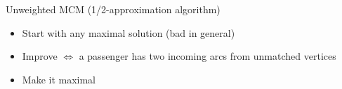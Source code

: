 \begin{frame}{Unweighted MCM (1/2-approximation algorithm)}
\begin{itemize}
  \item<1-3> Start with any maximal solution (bad in general)
  \item<4> Improve $\iff$ a passenger has two incoming arcs from unmatched
  vertices
  \item<6> Make it maximal
\end{itemize}
\centering

\end{frame}